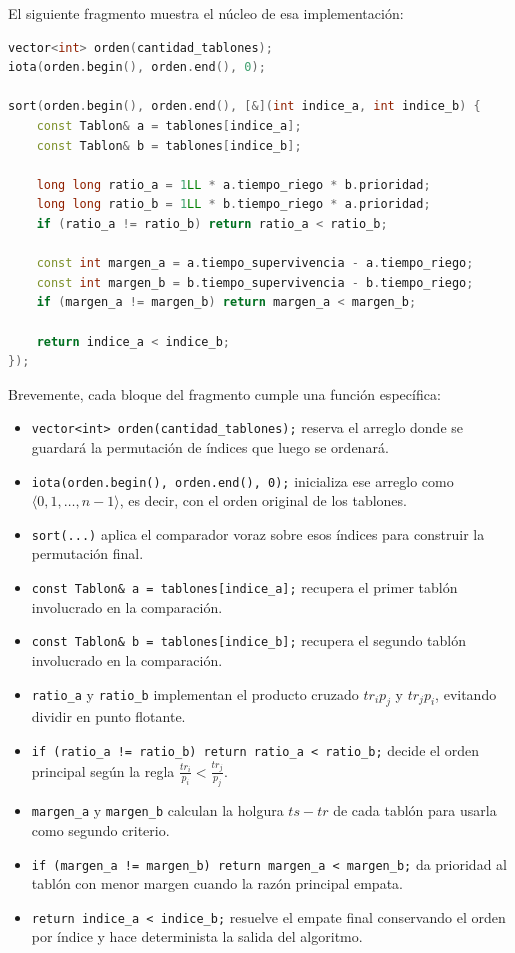 \documentclass[12pt,a4paper]{article}
\begin{document}
El siguiente fragmento muestra el n\'ucleo de esa implementaci\'on:

\begin{lstlisting}[language=C++]
vector<int> orden(cantidad_tablones);
iota(orden.begin(), orden.end(), 0);

sort(orden.begin(), orden.end(), [&](int indice_a, int indice_b) {
    const Tablon& a = tablones[indice_a];
    const Tablon& b = tablones[indice_b];

    long long ratio_a = 1LL * a.tiempo_riego * b.prioridad;
    long long ratio_b = 1LL * b.tiempo_riego * a.prioridad;
    if (ratio_a != ratio_b) return ratio_a < ratio_b;

    const int margen_a = a.tiempo_supervivencia - a.tiempo_riego;
    const int margen_b = b.tiempo_supervivencia - b.tiempo_riego;
    if (margen_a != margen_b) return margen_a < margen_b;

    return indice_a < indice_b;
});
\end{lstlisting}

\noindent Brevemente, cada bloque del fragmento cumple una funci\'on espec\'ifica:
\begin{itemize}
  \item \texttt{vector<int> orden(cantidad\_tablones);} reserva el arreglo donde se guardar\'a la permutaci\'on de \'indices que luego se ordenar\'a.
  \item \texttt{iota(orden.begin(), orden.end(), 0);} inicializa ese arreglo como \(\langle 0,1,\dots,n-1\rangle\), es decir, con el orden original de los tablones.
  \item \texttt{sort(...)} aplica el comparador voraz sobre esos \'indices para construir la permutaci\'on final.
  \item \texttt{const Tablon\& a = tablones[indice\_a];} recupera el primer tabl\'on involucrado en la comparaci\'on.
  \item \texttt{const Tablon\& b = tablones[indice\_b];} recupera el segundo tabl\'on involucrado en la comparaci\'on.
  \item \texttt{ratio\_a} y \texttt{ratio\_b} implementan el producto cruzado \(tr_i p_j\) y \(tr_j p_i\), evitando dividir en punto flotante.
  \item \texttt{if (ratio\_a != ratio\_b) return ratio\_a < ratio\_b;} decide el orden principal seg\'un la regla \(\frac{tr_i}{p_i}<\frac{tr_j}{p_j}\).
  \item \texttt{margen\_a} y \texttt{margen\_b} calculan la holgura \(ts-tr\) de cada tabl\'on para usarla como segundo criterio.
  \item \texttt{if (margen\_a != margen\_b) return margen\_a < margen\_b;} da prioridad al tabl\'on con menor margen cuando la raz\'on principal empata.
  \item \texttt{return indice\_a < indice\_b;} resuelve el empate final conservando el orden por \'indice y hace determinista la salida del algoritmo.
\end{itemize}
\end{document}
